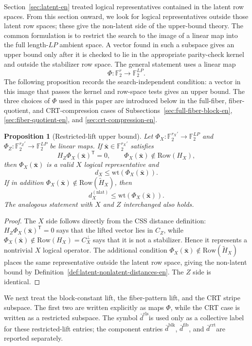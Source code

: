 \documentclass[11pt]{article}
\newcommand{\Ftwo}{\mathbb{F}_2}
\newcommand{\Row}{\mathrm{Row}}
\newcommand{\wt}{\mathrm{wt}}
\newcommand{\Htil}{\tilde{H}}
\newcommand{\dbound}[1]{\ensuremath{\bar{d}^{\mathrm{#1}}}}
\newcommand{\drls}{\dbound{rls}}
\newcommand{\dblk}{\dbound{blk}}
\newcommand{\dfib}{\dbound{fib}}
\newcommand{\dcrt}{\dbound{crt}}
\newcommand{\vect}[1]{\bm{#1}}
\newcommand{\vx}{\vect{x}}
\theoremstyle{uprightthm}
\newtheorem{proposition}[theorem]{Proposition}
\begin{document}
Section~\ref{sec:latent-en} treated logical representatives contained in the
latent row spaces.  From this section onward, we look for logical
representatives outside those latent row spaces; these give the non-latent side
of the upper-bound theory.  The common formulation is to restrict the search to
the image of a linear map into the full length-$LP$ ambient space.  A vector
found in such a subspace gives an upper bound only after it is checked to lie in
the appropriate parity-check kernel and outside the stabilizer row space.  The
general statement uses a linear map
\[
\Phi:\Ftwo^r\longrightarrow \Ftwo^{LP}.
\]
The following proposition records the search-independent condition:
a vector in this image that passes the kernel and row-space tests gives an
upper bound.  The three choices of $\Phi$ used in this paper are introduced below in the full-fiber,
fiber-quotient, and CRT-compression cases of
Subsections~\ref{sec:full-fiber-block-en}, \ref{sec:fiber-quotient-en}, and
\ref{sec:crt-compression-en}.

\begin{proposition}[Restricted-lift upper bound]
\label{prop:restricted-lift-upper-en}
Let $\Phi_X:\Ftwo^{r_X'}\to\Ftwo^{LP}$ and
$\Phi_Z:\Ftwo^{r_Z'}\to\Ftwo^{LP}$ be linear maps.  If
$\bar{\vx}\in\Ftwo^{r_X'}$ satisfies
\[
H_Z\Phi_X(\bar{\vx})^{\mathsf T}=0,
\qquad
\Phi_X(\bar{\vx})\notin\Row(H_X),
\]
then $\Phi_X(\bar{\vx})$ is a valid $X$ logical representative and
\[
d_X\le \wt(\Phi_X(\bar{\vx})).
\]
If in addition $\Phi_X(\bar{\vx})\notin\Row(\Htil_X)$, then
\[
d_X^{(\mathrm{nlat})}\le \wt(\Phi_X(\bar{\vx})).
\]
The analogous statement with $X$ and $Z$ interchanged also holds.
\end{proposition}

\begin{proof}
The $X$ side follows directly from the CSS distance definition:
$H_Z\Phi_X(\bar{\vx})^{\mathsf T}=0$ says that the lifted vector lies in
$C_Z$, while $\Phi_X(\bar{\vx})\notin\Row(H_X)=C_X^\perp$ says that it is not a
stabilizer.  Hence it represents a nontrivial $X$ logical operator.  The
additional condition $\Phi_X(\bar{\vx})\notin\Row(\Htil_X)$ places the same
representative outside the latent row space, giving the non-latent bound by
Definition~\ref{def:latent-nonlatent-distances-en}.  The $Z$ side is identical.
\end{proof}

We next treat the block-constant lift, the fiber-pattern lift, and the CRT
stripe subspace.  The first two are written explicitly as maps $\Phi$, while
the CRT case is written as a restricted subspace.  The symbol \drls is used only
as a collective label for these restricted-lift entries; the component entries
\dblk, \dfib, and \dcrt are reported separately.
\end{document}
